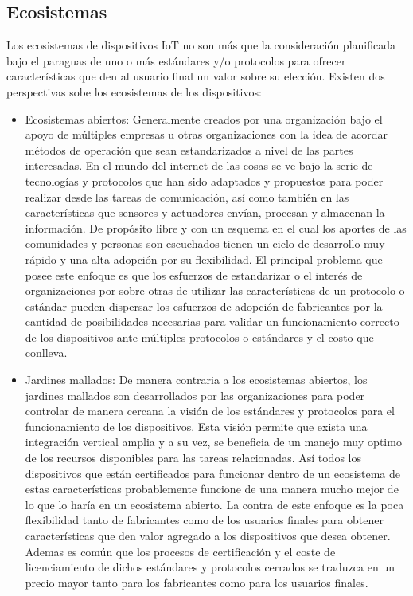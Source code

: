 \subsection{Ecosistemas}
Los ecosistemas de dispositivos IoT no son más que la consideración planificada bajo el paraguas de uno o más estándares y/o protocolos para ofrecer características que den al usuario final un valor sobre su elección. Existen dos perspectivas sobe los ecosistemas de los dispositivos: 
\begin{itemize}
\item Ecosistemas abiertos: Generalmente creados por una organización bajo el apoyo de múltiples empresas u otras organizaciones con la idea de acordar métodos de operación que sean estandarizados a nivel de las partes interesadas. En el mundo del internet de las cosas se ve bajo la serie de tecnologías y protocolos que han sido adaptados y propuestos para poder realizar desde las tareas de comunicación, así como también en las características que sensores y actuadores envían, procesan y almacenan la información. De propósito libre y con un esquema en el cual los aportes de las comunidades y personas son escuchados tienen un ciclo de desarrollo muy rápido y una alta adopción por su flexibilidad. El principal problema que posee este enfoque es que los esfuerzos de estandarizar o el interés de organizaciones por sobre otras de utilizar las características  de un protocolo o estándar pueden dispersar los esfuerzos de adopción de fabricantes por la cantidad de posibilidades necesarias para validar un funcionamiento correcto de los dispositivos ante múltiples protocolos o estándares y el costo que conlleva. 
\item Jardines mallados: De manera contraria a los ecosistemas abiertos, los jardines mallados son desarrollados por las organizaciones para poder controlar de manera cercana la visión de los estándares y protocolos para el funcionamiento de los dispositivos. Esta visión permite que exista una integración vertical amplia y a su vez, se beneficia de un manejo muy optimo de los recursos disponibles para las tareas relacionadas. Así todos los dispositivos que están certificados para funcionar dentro de un ecosistema de estas características probablemente funcione de una manera mucho mejor de lo que lo haría en un ecosistema abierto. La contra de este enfoque es la poca flexibilidad tanto de fabricantes como de los usuarios finales para obtener características que den valor agregado a los dispositivos que desea obtener\cite{iotInternetSociety}. Ademas es común que los procesos de certificación y el coste de licenciamiento de dichos estándares y protocolos cerrados se traduzca en un precio mayor tanto para los fabricantes como para los usuarios finales.
\end{itemize}

